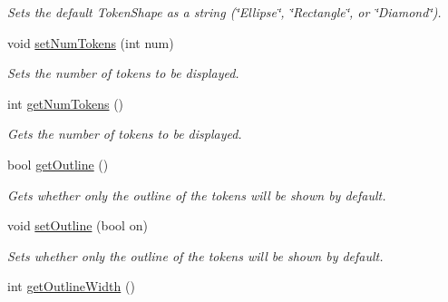 \begin{DoxyCompactItemize}
\begin{DoxyCompactList}\small\item\em Sets the default Token\-Shape as a string (\char`\"{}\-Ellipse\char`\"{}, \char`\"{}\-Rectangle\char`\"{}, or \char`\"{}\-Diamond\char`\"{}). \end{DoxyCompactList}\item 
\hypertarget{class_picto_1_1_token_factory_graphic_ab939d6de66d4fb3395a045e6ed483a6b}{void \hyperlink{class_picto_1_1_token_factory_graphic_ab939d6de66d4fb3395a045e6ed483a6b}{set\-Num\-Tokens} (int num)}\label{class_picto_1_1_token_factory_graphic_ab939d6de66d4fb3395a045e6ed483a6b}

\begin{DoxyCompactList}\small\item\em Sets the number of tokens to be displayed. \end{DoxyCompactList}\item 
\hypertarget{class_picto_1_1_token_factory_graphic_a3c00ca1526c0958f610051eaab933b3f}{int \hyperlink{class_picto_1_1_token_factory_graphic_a3c00ca1526c0958f610051eaab933b3f}{get\-Num\-Tokens} ()}\label{class_picto_1_1_token_factory_graphic_a3c00ca1526c0958f610051eaab933b3f}

\begin{DoxyCompactList}\small\item\em Gets the number of tokens to be displayed. \end{DoxyCompactList}\item 
\hypertarget{class_picto_1_1_token_factory_graphic_afe57ffd13a0135951aa8803d3a87312c}{bool \hyperlink{class_picto_1_1_token_factory_graphic_afe57ffd13a0135951aa8803d3a87312c}{get\-Outline} ()}\label{class_picto_1_1_token_factory_graphic_afe57ffd13a0135951aa8803d3a87312c}

\begin{DoxyCompactList}\small\item\em Gets whether only the outline of the tokens will be shown by default. \end{DoxyCompactList}\item 
\hypertarget{class_picto_1_1_token_factory_graphic_a7ae345ee92bc52f877217f321c92bd5e}{void \hyperlink{class_picto_1_1_token_factory_graphic_a7ae345ee92bc52f877217f321c92bd5e}{set\-Outline} (bool on)}\label{class_picto_1_1_token_factory_graphic_a7ae345ee92bc52f877217f321c92bd5e}

\begin{DoxyCompactList}\small\item\em Sets whether only the outline of the tokens will be shown by default. \end{DoxyCompactList}\item 
\hypertarget{class_picto_1_1_token_factory_graphic_a7f87d70ed67948ae1167ca698759e354}{int \hyperlink{class_picto_1_1_token_factory_graphic_a7f87d70ed67948ae1167ca698759e354}{get\-Outline\-Width} ()}\label{class_picto_1_1_token_factory_graphic_a7f87d70ed67948ae1167ca698759e354}


\end{DoxyCompactItemize}

